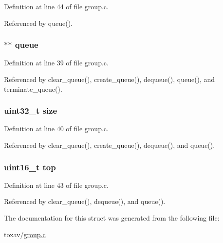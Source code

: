 Definition at line 44 of file group.\+c.



Referenced by queue().

\hypertarget{struct_group___jitter_buffer_a9829940d971aa22eb04b318876afb018}{
\subsubsection[{queue}]{$\ast$$\ast$ queue}}\label{struct_group___jitter_buffer_a9829940d971aa22eb04b318876afb018}


Definition at line 39 of file group.\+c.



Referenced by clear\+\_\+queue(), create\+\_\+queue(), dequeue(), queue(), and terminate\+\_\+queue().

\hypertarget{struct_group___jitter_buffer_ab2c6b258f02add8fdf4cfc7c371dd772}{
\subsubsection[{size}]{\setlength{\rightskip}{0pt plus 5cm}uint32\+\_\+t size}}\label{struct_group___jitter_buffer_ab2c6b258f02add8fdf4cfc7c371dd772}


Definition at line 40 of file group.\+c.



Referenced by clear\+\_\+queue(), create\+\_\+queue(), dequeue(), and queue().

\hypertarget{struct_group___jitter_buffer_a0c235a6df98714bb18538fc0afc5bad1}{
\subsubsection[{top}]{\setlength{\rightskip}{0pt plus 5cm}uint16\+\_\+t top}}\label{struct_group___jitter_buffer_a0c235a6df98714bb18538fc0afc5bad1}


Definition at line 43 of file group.\+c.



Referenced by clear\+\_\+queue(), dequeue(), and queue().



The documentation for this struct was generated from the following file\+:\begin{DoxyCompactItemize}
\item 
toxav/\hyperlink{toxav_2group_8c}{group.\+c}\end{DoxyCompactItemize}
